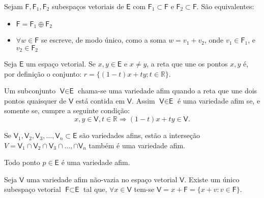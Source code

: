 \documentclass[10pt,a4paper]{article}
\begin{document}
\begin{theorem}
	Sejam $\textsf{F}, \textsf{F}_1, \textsf{F}_2$ subespaços vetoriais de $\textsf{E}$ com $\textsf{F}_1 \subset \textsf{F}$ e $\textsf{F}_2 \subset \textsf{F}$. São equivalentes:
	\begin{itemize}
		\item $\textsf{F} = \textsf{F}_1 \oplus \textsf{F}_2$
		\item $\forall w \in \textsf{F} $ se escreve, de modo único, como a soma $w = v_1 + v_2$, onde $v_1 \in \textsf{F}_1$, e $v_2 \in \textsf{F}_2$
	\end{itemize}
\end{theorem}	

\begin{definition}
	Seja $\textsf{E}$ um espaço vetorial. Se $x, y \in \textsf{E}$ e $x \neq y$, a reta que une os pontos $x, y$ é, por definição o conjunto: $r = \{(1 - t)x + ty; t \in \mathbb{R}\}$.
\end{definition}

\begin{definition}
	Um subconjunto $\textsf{V} \in \textsf{E}$ chama-se uma variedade afim quando a reta que une dois pontos quaisquer de $\textsf{V}$ está contida em $\textsf{V}$. Assim $\textsf{V} \in \textsf{E}$ é uma variedade afim se, e somente se, cumpre a seguinte condição:
	\[
		x, y \in \textsf{V}, t \in \mathbb{R} \Rightarrow (1 - t)x + ty \in \textsf{V}.
	\]
\end{definition}

\begin{theorem}
	Se $\textsf{V}_1, \textsf{V}_2, \textsf{V}_3, \dots, \textsf{V}_n  \subset \textsf{E}$ são variedades afins, estão a interseção $V = \textsf{V}_1 \cap \textsf{V}_2 \cap \textsf{V}_3 \cap \dots, \cap \textsf{V}_n$ também é uma variedade afim.
\end{theorem}

\begin{theorem}
	Todo ponto $p \in \textsf{E}$ é uma variedade afim.
\end{theorem}

\begin{theorem}
	Seja $\textsf{V}$ uma variedade afim não-vazia no espaço vetorial $\textsf{V}$. Existe um único subespaço vetorial $\textsf{F} \subset \textsf{E}$ tal que, $\forall x \in \textsf{V}$ tem-se $\textsf{V} = x + \textsf{F} = \{x + v: v\in \textsf{F} \}$.
\end{theorem}
\end{document}
